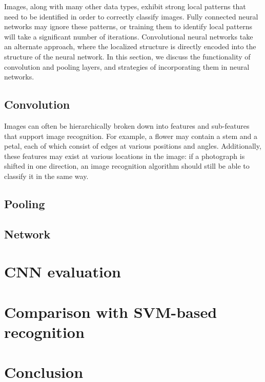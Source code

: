 \documentclass[12pt,twocolumn]{article}
\begin{document}
Images, along with many other data types, exhibit strong local patterns that need to be identified in order to correctly classify images. Fully connected neural networks may ignore these patterns, or training them to identify local patterns will take a significant number of iterations. Convolutional neural networks take an alternate approach, where the localized structure is directly encoded into the structure of the neural network. In this section, we discuss the functionality of convolution and pooling layers, and strategies of incorporating them in neural networks.

\subsection{Convolution}

Images can often be hierarchically broken down into features and sub-features that support image recognition. For example, a flower may contain a stem and a petal, each of which consist of edges at various positions and angles. Additionally, these features may exist at various locations in the image: if a photograph is shifted in one direction, an image recognition algorithm should still be able to classify it in the same way.



\subsection{Pooling}

\subsection{Network}

\section{CNN evaluation} \label{sec:evalcnn}

\section{Comparison with SVM-based recognition} \label{sec:evalfeature}

\section{Conclusion}
\end{document}

